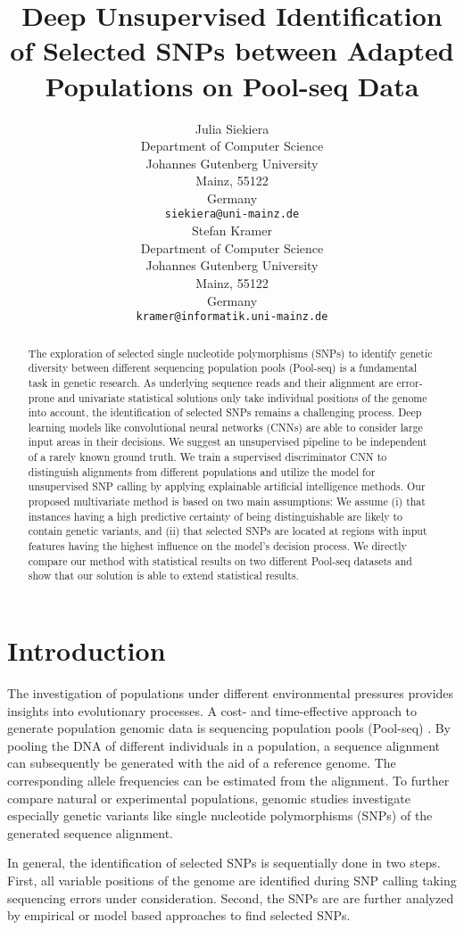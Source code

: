 \documentclass{article}
\title{Deep Unsupervised Identification of Selected SNPs between Adapted Populations on Pool-seq Data}
\author{
 Julia Siekiera \\
  Department of Computer Science\\
  Johannes Gutenberg University\\
  Mainz, 55122 \\
  Germany\\
  \texttt{siekiera@uni-mainz.de} \\
  \And
 Stefan Kramer \\
  Department of Computer Science\\
  Johannes Gutenberg University\\
  Mainz, 55122 \\
  Germany\\
  \texttt{kramer@informatik.uni-mainz.de}
}
\begin{document}
\maketitle
\begin{abstract}
The exploration of selected single nucleotide polymorphisms (SNPs) to identify genetic diversity between different sequencing population pools (Pool-seq) is a fundamental task in genetic research. As underlying sequence reads and their alignment are error-prone and univariate statistical solutions only take individual positions of the genome into account, the identification of selected SNPs remains a challenging process.
Deep learning models like convolutional neural networks (CNNs) are able to consider large input areas in their decisions. We suggest an unsupervised pipeline to be independent of a rarely known ground truth.
We train a supervised discriminator CNN to distinguish alignments from different populations and utilize the model for unsupervised SNP calling by applying explainable artificial intelligence methods. Our proposed multivariate method is based on two main assumptions: 
We assume (i) that instances having a high predictive certainty of being distinguishable are likely to contain genetic variants, and (ii) that selected SNPs are located at regions with input features having the highest influence on the model's decision process.
We directly compare our method with statistical results on two different Pool-seq datasets and show that our solution is able to extend statistical results. 
\end{abstract}

\section{Introduction}
The investigation of populations under different environmental pressures provides insights into evolutionary processes.
A cost- and time-effective approach to generate population genomic data is sequencing population pools (Pool-seq) \cite{Futschik_Schloetterer}. By pooling the DNA of different individuals in a population, a sequence alignment can subsequently be generated with the aid of a reference genome. The corresponding allele frequencies can be estimated from the alignment.
To further compare natural or experimental populations, genomic studies investigate especially genetic variants like single nucleotide polymorphisms (SNPs) of the generated sequence alignment.

In general, the identification of selected SNPs is sequentially done in two steps. First, all variable positions of the genome are identified during SNP calling taking sequencing errors under consideration. Second, the SNPs are are further analyzed by empirical or model based approaches to find selected SNPs.
\end{document}
